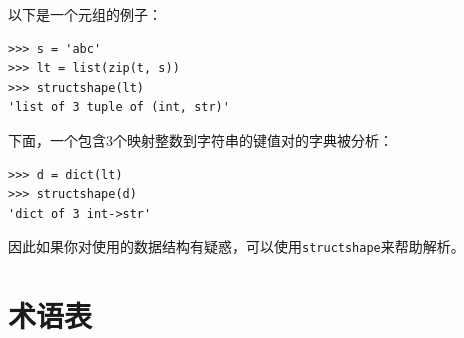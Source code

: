 %

以下是一个元组的例子：

\begin{lstlisting}
>>> s = 'abc'
>>> lt = list(zip(t, s))
>>> structshape(lt)
'list of 3 tuple of (int, str)'
\end{lstlisting}

%

下面，一个包含3个映射整数到字符串的键值对的字典被分析：

\begin{lstlisting}
>>> d = dict(lt)
>>> structshape(d)
'dict of 3 int->str'
\end{lstlisting}

%

因此如果你对使用的数据结构有疑惑，可以使用\lstinline{structshape}来帮助解析。

\section{术语表}

